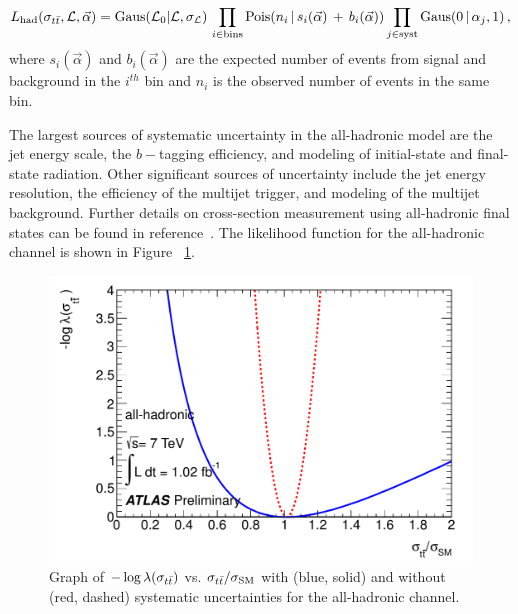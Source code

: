 \begin{equation}\label{Eq:dileplikelihood}
  L_{\text{had}}(\sigma_{t\bar{t}}, {\cal L}, \vec{\alpha }) = \text{Gaus}({\cal L}_0 | {\cal L}, \sigma_{\cal L})\, \prod_{i\in \text{bins}} \text{Pois}(n_{i} \,|\, s_{i}(\vec{\alpha}) \,+\, b_{i}(\vec{\alpha}))  \prod_{j\in \text{syst}} \text{Gaus}( 0 \,|\, \alpha_{j}, 1) \,  ,
\end{equation}
where $s_{i}(\vec{\alpha})$ and $b_{i}(\vec{\alpha})$ are the expected number of events from signal and background in the $i^{th}$ bin and $n_{i}$ is the observed number of events in the same bin. 

The largest sources of systematic uncertainty in the all-hadronic model are the jet energy scale, the $b-$tagging efficiency, and modeling of initial-state and final-state radiation.
Other significant sources of uncertainty include the jet energy resolution, the efficiency of the multijet trigger, and modeling of the multijet background.
Further details on cross-section measurement using all-hadronic final states can be found in reference~\cite{ATLAS-CONF-2011-140}.
The likelihood function for the all-hadronic channel is shown in Figure ~\ref{fig:allhad_likelihood}.

\begin{figure}[htbp]
  \begin{center}
    \includegraphics[width=.40\textwidth]{figures/comb/allhadronic_likelihood_curve}
  \caption{Graph of $-\log\lambda(\sigma_{t\bar{t}})$ vs. $\sigma_{t\bar{t}}/\sigma_{\rm SM}$ with (blue, solid) and without (red, dashed) systematic uncertainties for the all-hadronic channel.}
  \label{fig:allhad_likelihood}
  \end{center}
\end{figure}



